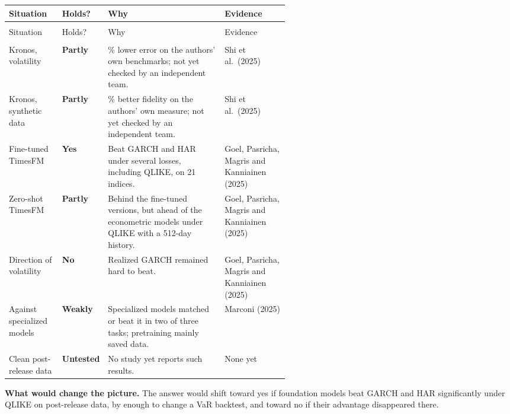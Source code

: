 {\small
\begin{longtable}{@{}>{\raggedright\arraybackslash}p{0.19\linewidth}>{\raggedright\arraybackslash}p{0.13\linewidth}>{\raggedright\arraybackslash}p{}>{\raggedright\arraybackslash}p{0.23\linewidth}@{}}
\toprule
Situation & Holds? & Why & Evidence \\
\midrule
\endfirsthead
\multicolumn{4}{@{}l}{\emph{(continued)}} \\
\toprule
Situation & Holds? & Why & Evidence \\
\midrule
\endhead
\midrule
\multicolumn{4}{r@{}}{\emph{(continued on the next page)}} \\
\endfoot
\bottomrule
\endlastfoot
Kronos, volatility & \textbf{Partly} & 9\% lower error on the authors' own benchmarks; not yet checked by an independent team. & Shi et al.\ (2025) \\*
\addlinespace[3pt]
Kronos, synthetic data & \textbf{Partly} & 22\% better fidelity on the authors' own measure; not yet checked by an independent team. & Shi et al.\ (2025) \\
\addlinespace[3pt]
Fine-tuned TimesFM & \textbf{Yes} & Beat GARCH and HAR under several losses, including QLIKE, on 21 indices. & Goel, Pasricha, Magris and Kanniainen (2025) \\
\addlinespace[3pt]
Zero-shot TimesFM & \textbf{Partly} & Behind the fine-tuned versions, but ahead of the econometric models under QLIKE with a 512-day history. & Goel, Pasricha, Magris and Kanniainen (2025) \\
\addlinespace[3pt]
Direction of volatility & \textbf{No} & Realized GARCH remained hard to beat. & Goel, Pasricha, Magris and Kanniainen (2025) \\
\addlinespace[3pt]
Against specialized models & \textbf{Weakly} & Specialized models matched or beat it in two of three tasks; pretraining mainly saved data. & Marconi (2025) \\*
\addlinespace[3pt]
Clean post-release data & \textbf{Untested} & No study yet reports such results. & None yet \\
\end{longtable}
\addtocounter{table}{-1}%
}

\textbf{What would change the picture.} The answer would shift toward yes if foundation models beat GARCH and HAR significantly under QLIKE on post-release data, by enough to change a VaR backtest, and toward no if their advantage disappeared there.

